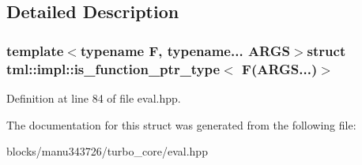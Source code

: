 \subsection{Detailed Description}
\subsubsection*{template$<$typename F, typename... A\+R\+G\+S$>$struct tml\+::impl\+::is\+\_\+function\+\_\+ptr\+\_\+type$<$ F(\+A\+R\+G\+S...)$>$}



Definition at line 84 of file eval.\+hpp.



The documentation for this struct was generated from the following file\+:\begin{DoxyCompactItemize}
\item 
blocks/manu343726/turbo\+\_\+core/eval.\+hpp\end{DoxyCompactItemize}
